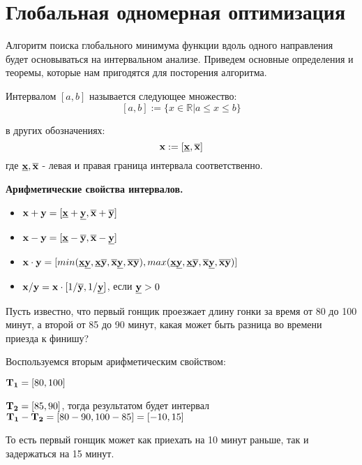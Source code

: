 \section{Глобальная одномерная оптимизация}
Алгоритм поиска глобального минимума функции вдоль одного направления будет основываться на интервальном анализе. Приведем основные определения и теоремы, которые нам пригодятся для посторения алгоритма.

\begin{definition*}
Интервалом $[a, b]$ называется следующее множество:
$$[a,b]:=\{x \in \mathbb{R} | a \le x \le b\}$$

в других обозначениях:
$$\bold{x}:=[\bold{\underline{x}},\bold{\overline{x}}]$$где $\bold{\underline{x}},\bold{\overline{x}}$ - левая и правая граница интервала соответственно.
\end{definition*}

\textbf{Арифметические свойства интервалов.}
\begin{itemize}

    \item $\bold{x} + \bold{y} = [{\bold{\underline{x}} + \bold{\underline{y}},  \bold{\overline{x}} + \bold{\overline{y}}}]$

    \item $\bold{x} - \bold{y} = [{\bold{\underline{x}} - \bold{\overline{y}},  \bold{\overline{x}} - \bold{\underline{y}}}]$

    \item $\bold{x} \cdot \bold{y} = [min(\bold{\underline{x} \underline{y}}, \bold{\underline{x} \overline{y}}, \bold{\overline{x} \underline{y}}, \bold{\overline{x} \overline{y}}) , max(\bold{\underline{x} \underline{y}}, \bold{\underline{x} \overline{y}}, \bold{\overline{x} \underline{y}}, \bold{\overline{x} \overline{y}})]$

    \item $\bold{x} / \bold{y} = \bold{x} \cdot[1/\bold{\overline{y}}, 1/\bold{\underline{y}}]$, если $\bold{\underline{y}} > 0$
\end{itemize}

\begin{example*}
Пусть известно, что первый гонщик проезжает длину гонки за время от 80 до 100 минут, а второй от 85 до 90 минут, какая может быть разница во времени приезда к финишу?

Воспользуемся вторым арифметическим свойством:

$\bold{T_1} = [80, 100]$

$\bold{T_2} = [85, 90]$, тогда результатом будет интервал $\bold{T_1} - \bold{T_2} = [80-90, 100-85] = [-10, 15]$

То есть первый гонщик может как приехать на 10 минут раньше, так и задержаться на 15 минут.
\end{example*}

